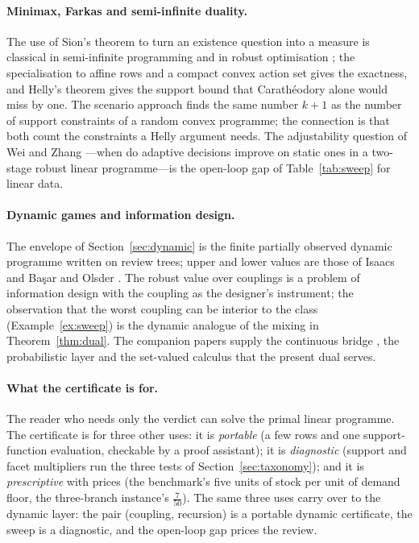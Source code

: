 \documentclass[11pt,a4paper]{article}
\theoremstyle{plain}
\theoremstyle{definition}
\theoremstyle{remark}
\newcommand{\tfr}[2]{\tfrac{#1}{#2}}
\begin{document}
\paragraph{Minimax, Farkas and semi-infinite duality.} The use of Sion's theorem to turn an existence question into a measure is classical in semi-infinite programming \cite{HettichKortanek1993,AndersonNash1987} and in robust optimisation \cite{BenTalNemirovski1999,BenTal2009}; the specialisation to affine rows and a compact convex action set gives the exactness, and Helly's theorem gives the support bound that Carath\'eodory alone would miss by one. The scenario approach \cite{CalafioreCampi2006,CampiGaratti2008} finds the same number $k+1$ as the number of support constraints of a random convex programme; the connection is that both count the constraints a Helly argument needs. The adjustability question of Wei and Zhang \cite{WeiZhang2024}---when do adaptive decisions improve on static ones in a two-stage robust linear programme---is the open-loop gap of Table~\ref{tab:sweep} for linear data.

\paragraph{Dynamic games and information design.} The envelope of Section~\ref{sec:dynamic} is the finite partially observed dynamic programme \cite{Astrom1965,BertsekasShreve1978} written on review trees; upper and lower values are those of Isaacs \cite{Isaacs1965} and Ba\c{s}ar and Olsder \cite{BasarOlsder1999}. The robust value over couplings is a problem of information design \cite{BergemannMorris2019} with the coupling as the designer's instrument; the observation that the worst coupling can be interior to the class (Example~\ref{ex:sweep}) is the dynamic analogue of the mixing in Theorem~\ref{thm:dual}. The companion papers supply the continuous bridge \cite{Abaee2026cert}, the probabilistic layer \cite{Abaee2026prob} and the set-valued calculus \cite{Abaee2026calc} that the present dual serves.

\paragraph{What the certificate is for.} The reader who needs only the verdict can solve the primal linear programme. The certificate is for three other uses: it is \emph{portable} (a few rows and one support-function evaluation, checkable by a proof assistant); it is \emph{diagnostic} (support and facet multipliers run the three tests of Section~\ref{sec:taxonomy}); and it is \emph{prescriptive} with prices (the benchmark's five units of stock per unit of demand floor, the three-branch instance's $\tfr7{50}$). The same three uses carry over to the dynamic layer: the pair (coupling, recursion) is a portable dynamic certificate, the sweep is a diagnostic, and the open-loop gap prices the review.
\end{document}
